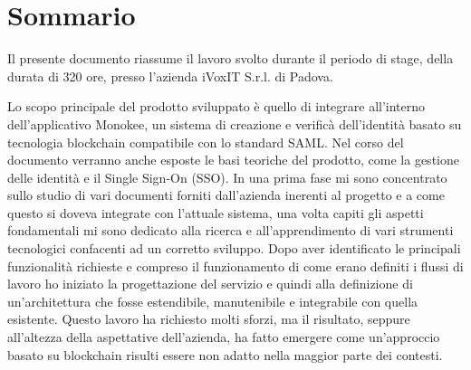 
\cleardoublepage
{}
{}
\begingroup
\let\clearpage\relax
\let\cleardoublepage\relax
\let\cleardoublepage\relax

\chapter*{Sommario}

Il presente documento riassume il lavoro svolto durante il periodo di stage, della durata
di 320 ore, presso l’azienda iVoxIT S.r.l. di Padova.

Lo scopo principale del prodotto sviluppato è quello di integrare all'interno dell'applicativo Monokee, un sistema di creazione e verificà dell'identità basato su tecnologia blockchain compatibile con lo standard SAML. 
Nel corso del documento verranno anche esposte le basi teoriche del prodotto, come la gestione delle identità e il Single Sign-On (SSO).
In una prima fase mi sono concentrato sullo studio di vari documenti forniti dall'azienda inerenti al progetto e a come questo si doveva integrate con l'attuale sistema,
una volta capiti gli aspetti fondamentali mi sono dedicato alla ricerca e all'apprendimento di vari strumenti tecnologici
confacenti ad un corretto sviluppo.
Dopo aver identificato le principali funzionalità richieste e compreso il funzionamento di come erano definiti i flussi di lavoro ho iniziato la progettazione del servizio e quindi alla definizione di
un’architettura che fosse estendibile, manutenibile e integrabile con quella esistente. Questo lavoro ha
richiesto molti sforzi, ma il risultato, seppure all’altezza della aspettative dell’azienda, ha fatto emergere come un'approccio basato su blockchain risulti essere non adatto nella maggior parte dei contesti.


%
%

\endgroup			

\vfill

